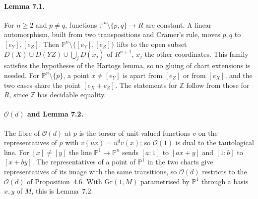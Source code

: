 \documentclass[11pt]{article}
\newcommand{\PP}{\mathbb{P}^1}
\theoremstyle{remark}
\begin{document}
\paragraph{Lemma 7.1.} For $n\ge2$ and $p\ne q$, functions
$\mathbb P^n\setminus\{p,q\}\to R$ are constant. A linear automorphism,
built from two transpositions and Cramer's rule, moves $p,q$ to
$[e_Y],[e_Z]$. Then $\mathbb P^n\setminus\{[e_Y],[e_Z]\}$ lifts to the
open subset $D(X)\cup D(YZ)\cup\bigcup_jD(x_j)$ of $R^{n+1}$, $x_j$ the
other coordinates. This family satisfies the hypotheses of the Hartogs
lemma, so no gluing of chart extensions is needed. For
$\mathbb P^n\setminus\{p\}$, a point $x\ne[e_Y]$ is apart from $[e_Z]$
or from $[e_X]$, and the two cases share the point $[e_X+e_Z]$. The
statements for $\mathbb Z$ follow from those for $R$, since $\mathbb Z$ has
decidable equality.

\paragraph{$\mathcal O(d)$ and Lemma 7.2.} The fibre of $\mathcal O(d)$
at $p$ is the torsor of unit-valued functions $v$ on the representatives
of $p$ with $v(ux)=u^dv(x)$; so $\mathcal O(1)$ is dual to the tautological
line. For $[x]\ne[y]$ the line $\PP\to\mathbb P^n$ sends $[a:1]$ to
$[ax+y]$ and $[1:b]$ to $[x+by]$. The representatives of a point of $\PP$
in the two charts give representatives of its image with the same
transitions, so $\mathcal O(d)$ restricts to the $\mathcal O(d)$ of
Proposition~4.6. With $\mathrm{Gr}(1,M)$ parametrised by $\PP$ through a
basis $x,y$ of $M$, this is Lemma~7.2.
\end{document}

